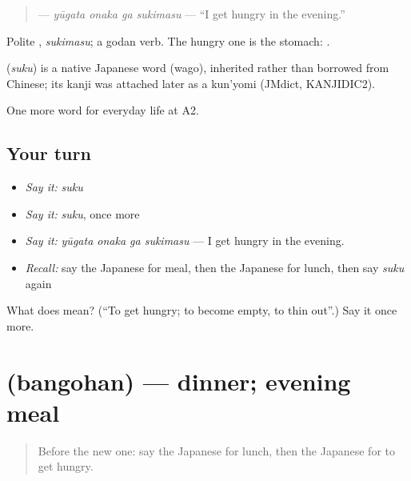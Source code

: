 \begin{quote}
\textbf{  } — \emph{yūgata onaka ga sukimasu} — \textquotedblleft{}I get hungry in the evening.\textquotedblright{}
\end{quote}

Polite \textbf{}, \emph{sukimasu}; a godan verb. The hungry one is the stomach: \textbf{ }.

\begin{cousinweb}
\textbf{} (\emph{suku}) is a native Japanese word (wago), inherited rather than borrowed from Chinese; its kanji was attached later as a kun'yomi (JMdict, KANJIDIC2).
\end{cousinweb}

\begin{grammarlens}[title={What you've built}]
One more word for everyday life at A2.
\end{grammarlens}

\subsection*{Your turn}
\begin{itemize}
\raggedright
  \item \emph{Say it:} \emph{suku}
  \item \emph{Say it:} \emph{suku}, once more
  \item \emph{Say it:} \emph{yūgata onaka ga sukimasu} — I get hungry in the evening.
  \item \emph{Recall:} say the Japanese for meal, then the Japanese for lunch, then say \emph{suku} again
\end{itemize}

\begin{tcolorbox}[breakable,colback=teal!4,colframe=teal!35!black,title={Before you move on}]
What does  mean? (\textquotedblleft{}To get hungry; to become empty, to thin out\textquotedblright{}.) Say it once more.
\end{tcolorbox}
\section[\texorpdfstring{\ja{ばんごはん} (bangohan)}{ばんごはん (bangohan)}]{ (bangohan) — dinner; evening meal}

\label{lesson:JA-C172-bangohan}



\begin{quote}
Before the new one: say the Japanese for lunch, then the Japanese for to get hungry.
\end{quote}

